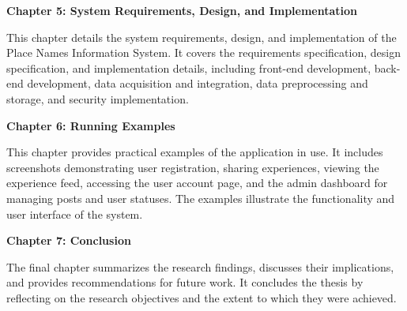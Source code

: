 \textbf{Chapter 5: System Requirements, Design, and Implementation}

This chapter details the system requirements, design, and implementation of the Place Names Information System. It covers the requirements specification, design specification, and implementation details, including front-end development, back-end development, data acquisition and integration, data preprocessing and storage, and security implementation.

\textbf{Chapter 6: Running Examples}

This chapter provides practical examples of the application in use. It includes screenshots demonstrating user registration, sharing experiences, viewing the experience feed, accessing the user account page, and the admin dashboard for managing posts and user statuses. The examples illustrate the functionality and user interface of the system.

\textbf{Chapter 7: Conclusion}

The final chapter summarizes the research findings, discusses their implications, and provides recommendations for future work. It concludes the thesis by reflecting on the research objectives and the extent to which they were achieved.
